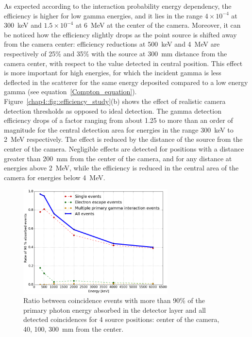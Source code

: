 As expected according to the interaction probability energy dependency, the efficiency is higher for low gamma energies, and it lies in the range $4\times10^{-4}$ at 300~keV and $1.5\times10^{-4}$ at 6~MeV at the center of the camera. Moreover, it can be noticed how the efficiency slightly drops as the point source is shifted away from the camera center: efficiency reductions at 500~keV and 4~MeV are respectively of 25\% and 35\% with the source at 300~mm distance from the camera center, with respect to the value detected in central position. This effect is more important for high energies, for which the incident gamma is less deflected in the scatterer for the same energy deposited compared to a low energy gamma (see equation~\ref{Compton_equation}).\\  
Figure~\ref{chap4::fig::efficiency_study}(b) shows the effect of realistic camera detection thresholds as opposed to ideal detection. The gamma detection efficiency drops of a factor ranging from about 1.25 to more than an order of magnitude for the central detection area for energies in the range 300~keV to 2~MeV respectively. The effect is reduced by the distance of the source from the center of the camera. Negligible effects are detected for positions with a distance greater than 200~mm from the center of the camera, and for any distance at energies above 2~MeV, while the efficiency is reduced in the central area of the camera for energies below 4~MeV.\\

\begin{figure} [!hbtp]	
\centering
\includegraphics[width=0.7\textwidth]{03_GraphicFiles/chapter4_HTsimu/new/90absFracVSenergy_hadronth.png}
\caption{Ratio between coincidence events with more than 90\% of the primary photon energy absorbed in the detector layer and all detected coincidences for 4 source positions: center of the camera, 40, 100, 300~mm from the center.}
\label{chap4::fig::rate_full_abs}
\end{figure}

